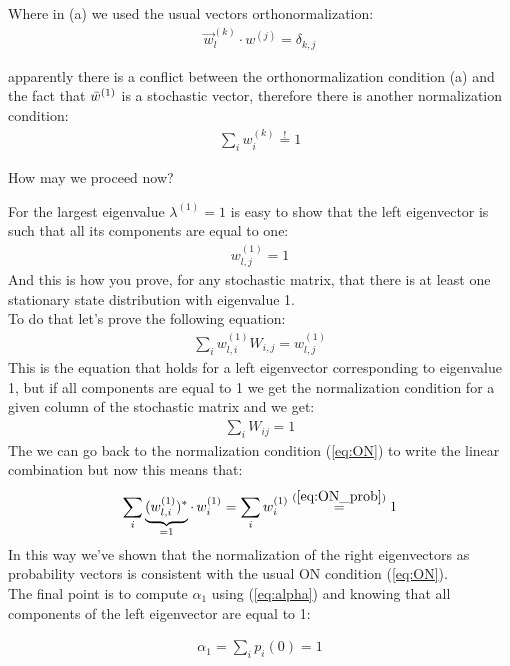 \documentclass[\main/main.tex]{subfiles}
\begin{document}
Where in (a) we used the usual vectors orthonormalization:
\begin{align}
    \Vec{w}_l ^{(k)}\cdot w^{(j)}=\delta_{k,j}
    \label{eq:ON}
\end{align}

apparently there is a conflict between the orthonormalization condition (a) and the fact that $\Bar{w}^{(1)}$ is a  stochastic vector, therefore there is another normalization condition: 
\begin{eqnarray}
\sum_i w_i^{(k)}\overset{!}{=}1
\label{eq:ON_prob}
\end{eqnarray}

How may we proceed now?

For the largest eigenvalue $\lambda^{(1)}=1$ is easy to show that the left eigenvector is such that all its components are equal to one:
\begin{eqnarray}
\boxed{w_{l,j}^{(1)}=1}
\end{eqnarray}
And this is how you prove, for any stochastic matrix, that there is at least one stationary state distribution with eigenvalue 1. \\

To do that let's prove the following equation:
\begin{eqnarray}
\sum_i w_{l,i}^{(1)}W_{i,j}=w_{l,j}^{(1)}
\end{eqnarray}
This is the equation that holds for a left eigenvector corresponding to eigenvalue 1, but if all components are equal to 1 we get the normalization condition for a given column of the stochastic matrix and we get:
\begin{eqnarray}
\sum_i W_{ij}=1
\end{eqnarray}
The we can go back to the normalization condition (\ref{eq:ON}) to write the linear combination but now this means that:
\begin{align}
    \sum_i \underbrace{(w_{l,i}^{(1)})^*}_{=1}\cdot \,w_i^{(1)}=\sum_i w_i^{(1)}\overset{(\ref{eq:ON_prob})}{=}1
\end{align}
In this way we've shown that the normalization of the right eigenvectors as probability vectors is consistent with the usual ON condition (\ref{eq:ON}). \\

The final point is to compute $\alpha_1$ using (\ref{eq:alpha}) and knowing that all components of the left eigenvector are equal to 1:

\begin{eqnarray}
\alpha_1=\sum_i p_i(0)=1
\end{eqnarray}
\end{document}
